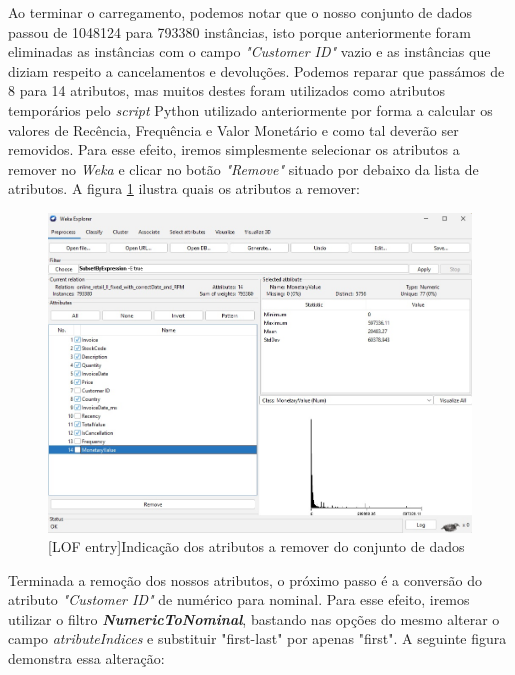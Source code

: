 \documentclass{easychair}
\begin{document}
\vspace{-0.3cm}
Ao terminar o carregamento, podemos notar que o nosso conjunto de dados passou de 1048124 para 793380 instâncias, isto porque anteriormente foram eliminadas as instâncias com o campo \textit{"Customer ID"} vazio e as instâncias que diziam respeito a cancelamentos e devoluções. Podemos reparar que passámos de 8 para 14 atributos, mas muitos destes foram utilizados como atributos temporários pelo \textit{script} Python utilizado anteriormente por forma a calcular os valores de Recência, Frequência e Valor Monetário e como tal deverão ser removidos. Para esse efeito, iremos simplesmente selecionar os atributos a remover no \textit{Weka} e clicar no botão \textit{"Remove"} situado por debaixo da lista de atributos. A figura \ref{fig3} ilustra quais os atributos a remover:
\begin{figure}[H]
    \begin{centering}
    \includegraphics[width=0.7\linewidth]{imagens/figure3.jpg}\label{cap-2-fig3}
    [LOF entry]{Indicação dos atributos a remover do conjunto de dados}
    \label{fig3}
    \end{centering}
\end{figure}
Terminada a remoção dos nossos atributos, o próximo passo é a conversão do atributo \textit{"Customer ID"} de numérico para nominal. Para esse efeito, iremos utilizar o filtro \textit{\textbf{NumericToNominal}}, bastando nas opções do mesmo alterar o campo \textit{atributeIndices} e substituir "first-last" por apenas "first". A seguinte figura demonstra essa alteração:
\end{document}
